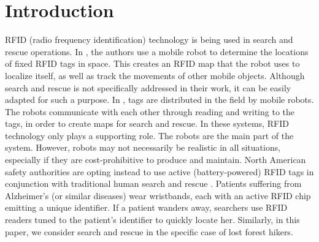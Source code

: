 \documentclass[conference]{IEEEtran}
\begin{document}
\section{Introduction}
RFID (radio frequency identification) technology is being used in search and rescue operations.  In \cite{conf:Hahnel01}, the authors use a mobile robot to determine the locations of fixed RFID tags in space.  This creates an RFID map that the robot uses to localize itself, as well as track the movements of other mobile objects.  Although search and rescue is not specifically addressed in their work, it can be easily adapted for such a purpose.  In \cite{conf:Kleiner01}, tags are distributed in the field by mobile robots.  The robots communicate with each other through reading and writing to the tags, in order to create maps for search and rescue.  In these systems, RFID technology only plays a supporting role.  The robots are the main part of the system.  However, robots may not necessarily be realistic in all situations, especially if they are cost-prohibitive to produce and maintain.  North American safety authorities are opting instead to use active (battery-powered) RFID tags in conjunction with traditional human search and rescue \cite{web:search01}.  Patients suffering from Alzheimer's (or similar diseases) wear wristbands, each with an active RFID chip emitting a unique identifier.  If a patient wanders away, searchers use RFID readers tuned to the patient's identifier to quickly locate her.  Similarly, in this paper, we consider search and rescue in the specific case of lost forest hikers.
\end{document}

